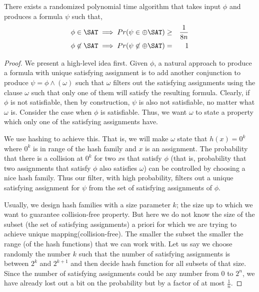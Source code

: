 \begin{corollary}
There exists a randomized polynomial time algorithm that takes input $\phi$ and produces a formula $\psi$ such that,
\begin{eqnarray*}
\phi \in \SAT \implies Pr(\psi \in \oplus\SAT) & \geq &  \frac{1}{8n} \\
\phi \not\in \SAT \implies Pr (\psi \not\in \oplus\SAT) & = & 1
\end{eqnarray*}
\end{corollary}

\begin{proof}
We present a high-level idea first. Given $\phi$, a natural approach to produce a formula with unique satisfying assignment is to add another conjunction to produce $\psi = \phi \land (\omega)$ such that $\omega$ 
filters out the satisfying assignments using the clause $\omega$ such that only one of them will satisfy the resulting formula. Clearly, if $\phi$ is not satisfiable, then by construction, $\psi$ is also not satisfiable, no matter what $\omega$ is. Consider the case when $\phi$ is satisfiable. Thus, we want $\omega$ to state a property which only one of the satisfying assignments have. 

We use hashing to achieve this. That is, we will make $\omega$ state that $h(x) = 0^k$ where $0^k$ is in range of the hash family and $x$ is an assignment. The probability that there is a collision at $0^k$ for two $x$s that satisfy $\phi$ (that is, probability that two assignments that satisfy $\phi$ also satisfies $\omega$) can be controlled by choosing a nice hash family. Thus our filter, with high probability, filters out a unique satisfying assignment for $\psi$ from the set of satisfying assignments of $\phi$.

Usually, we design hash families with a size parameter $k$; the size up to which we want to guarantee collision-free property. But here we do not know the size of the subset (the set of satisfying assignments) a priori for which we are trying to achieve unique mapping(collision-free). The smaller the subset the smaller the range (of the hash functions) that we can work with. Let us say we choose randomly the number $k$ such that the number of satisfying assignments is between $2^k$ and $2^{k+1}$ and then decide hash function for all subsets of that size. Since the number of satisfying assignments could be any number from $0$ to $2^n$, we have already lost out a bit on the probability but by a factor of at most $\frac{1}{n}$.


\end{proof}
